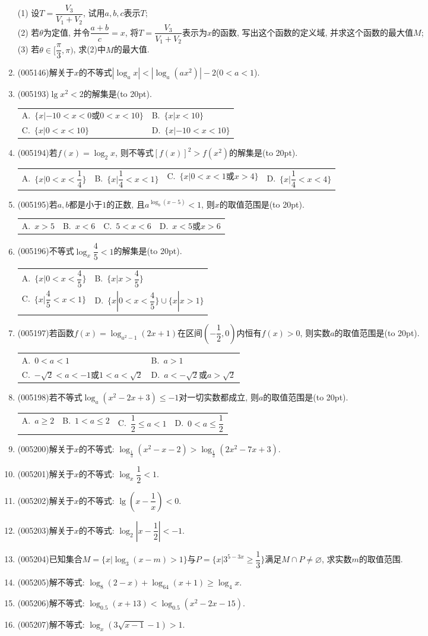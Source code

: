 \documentclass[10pt,a4paper]{article}
\newcommand{\bracket}[1]{(\hbox to #1pt{})}
\newcommand{\twoch}[4]{\par\begin{tabular}{p{.46\textwidth}p{.46\textwidth}}
A.~#1& B.~#2\\
C.~#3& D.~#4
\end{tabular}}
\newcommand{\fourch}[4]{\par\begin{tabular}{p{.23\textwidth}p{.23\textwidth}p{.23\textwidth}p{.23\textwidth}}
A.~#1 &B.~#2& C.~#3& D.~#4
\end{tabular}}
\begin{document}
\begin{enumerate}[1.]
(1) 设$T=\dfrac{V_3}{V_1+V_2}$, 试用$a,b,c$表示$T$;\\
(2) 若$\theta$为定值, 并令$\dfrac{a+b}c=x$, 将$T=\dfrac{V_3}{V_1+V_2}$表示为$x$的函数, 写出这个函数的定义域, 并求这个函数的最大值$M$;\\
(3) 若$\theta \in [\dfrac{\pi }3,\pi)$, 求(2)中$M$的最大值.
\item {\tiny (005146)}解关于$x$的不等式$|\log_ax|<|\log_a(ax^2)|-2$($0<a<1$).
\item {\tiny (005193)}$\lg x^2<2$的解集是\bracket{20}.
\twoch{$\{x|-10<x<0\text{或}0<x<10\}$}{$\{x|x<10\}$}{$\{x|0<x<10\}$}{$\{x|-10<x<10\}$}
\item {\tiny (005194)}若$f(x)=\log_2x$, 则不等式$[f(x)]^2>f(x^2)$的解集是\bracket{20}.
\fourch{$\{x|0<x<\dfrac 14\}$}{$\{x|\dfrac 14<x<1\}$}{$\{x|0<x<1\text{或}x>4\}$}{$\{x|\dfrac 14<x<4\}$}
\item {\tiny (005195)}若$a,b$都是小于$1$的正数, 且$a^{\log_b(x-5)}<1$, 则$x$的取值范围是\bracket{20}.
\fourch{$x>5$}{$x<6$}{$5<x<6$}{$x<5$或$x>6$}
\item {\tiny (005196)}不等式$\log_x\dfrac 45<1$的解集是\bracket{20}.
\twoch{$\{x|0<x<\dfrac 45\}$}{$\{x|x>\dfrac 45\}$}{$\{x|\dfrac 45<x<1\}$}{$\{x|0<x<\dfrac 45\}\cup \{x|x>1\}$}
\item {\tiny (005197)}若函数$f(x)=\log_{a^2-1}(2x+1)$在区间$(-\dfrac 12,0)$内恒有$f(x)>0$, 则实数$a$的取值范围是\bracket{20}.
\twoch{$0<a<1$}{$a>1$}{$-\sqrt 2<a<-1$或$1<a<\sqrt 2$}{$a<-\sqrt 2$或$a>\sqrt 2$}
\item {\tiny (005198)}若不等式$\log_a(x^2-2x+3)\le -1$对一切实数都成立, 则$a$的取值范围是\bracket{20}.
\fourch{$a\ge 2$}{$1<a\le 2$}{$\dfrac 12\le a<1$}{$0<a\le \dfrac 12$}
\item {\tiny (005200)}解关于$x$的不等式: $\log_{\frac 13}(x^2-x-2)>\log_{\frac 13}(2x^2-7x+3)$.
\item {\tiny (005201)}解关于$x$的不等式: $\log_x\dfrac 12<1$.
\item {\tiny (005202)}解关于$x$的不等式: $\lg (x-\dfrac 1x)<0$.
\item {\tiny (005203)}解关于$x$的不等式: $\log_2|x-\dfrac 12|<-1$.
\item {\tiny (005204)}已知集合$M=\{x|\log_3(x-m)>1\}$与$P=\{x|3^{5-3x} \ge \dfrac 13\}$满足$M\cap P\ne \varnothing$, 求实数$m$的取值范围.
\item {\tiny (005205)}解不等式: $\log_8(2-x)+\log_{64}(x+1)\ge \log_4x$.
\item {\tiny (005206)}解不等式: $\log_{0.5}(x+13)<\log_{0.5}(x^2-2x-15)$.
\item {\tiny (005207)}解不等式: $\log_x(3\sqrt{x-1}-1)>1$.

\end{enumerate}
\end{document}
